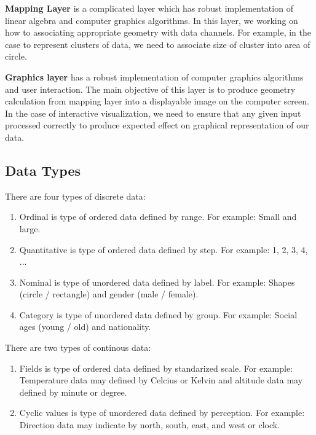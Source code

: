 \documentclass[11pt]{article}
\providecommand{\tightlist}{%
      \setlength{\itemsep}{0pt}\setlength{\parskip}{0pt}}
\begin{document}
\textbf{Mapping Layer} is a complicated layer which has robust
implementation of linear algebra and computer graphics algorithms. In
this layer, we working on how to associating appropriate geometry with
data channels. For example, in the case to represent clusters of data,
we need to associate size of cluster into area of circle.

\textbf{Graphics layer} has a robust implementation of computer graphics
algorithms and user interaction. The main objective of this layer is to
produce geometry calculation from mapping layer into a displayable image
on the computer screen. In the case of interactive visualization, we
need to ensure that any given input processed correctly to produce
expected effect on graphical representation of our data.

    \subsection{Data Types}\label{data-types}

There are four types of discrete data:

\begin{enumerate}
\def\labelenumi{\arabic{enumi}.}
\tightlist
\item
  Ordinal is type of ordered data defined by range. For example: Small
  and large.
\item
  Quantitative is type of ordered data defined by step. For example: 1,
  2, 3, 4, ...
\item
  Nominal is type of unordered data defined by label. For example:
  Shapes (circle / rectangle) and gender (male / female).
\item
  Category is type of unordered data defined by group. For example:
  Social ages (young / old) and nationality.
\end{enumerate}

There are two types of continous data:

\begin{enumerate}
\def\labelenumi{\arabic{enumi}.}
\tightlist
\item
  Fields is type of ordered data defined by standarized scale. For
  example: Temperature data may defined by Celcius or Kelvin and
  altitude data may defined by minute or degree.
\item
  Cyclic values is type of unordered data defined by perception. For
  example: Direction data may indicate by north, south, east, and west
  or clock.
\end{enumerate}
\end{document}
